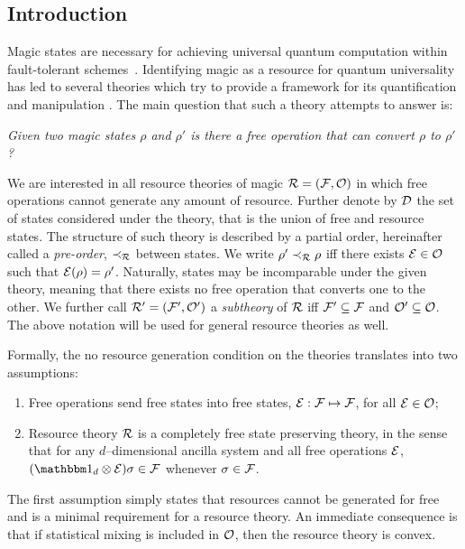 \documentclass[pra,
aps,
twocolumn,
superscriptaddress,
groupedaddress,
nofootinbib,
reprint
]{revtex4-1}
\begin{document}
\subsection{Introduction}
\label{sec:intro}

Magic states are necessary for achieving universal quantum computation within fault-tolerant schemes~\cite{cit:veitch, cit:mari, cit:gottesman, cit:bravyi, cit:knill, Campbell_2011}.
Identifying magic as a resource for quantum universality has led to several theories which try to provide a framework for its quantification and manipulation \cite{cit:veitch2, cit:howard, Wang_2019, Seddon_2021}.
The main question that such a theory attempts to answer is:
\begin{center}
    \emph{Given two magic states $\rho$ and $\rho'$ is there a free operation that can convert $\rho$ to $\rho'$?}
\end{center}

We are interested in all resource theories of magic $\mathcal{R} = (\mathcal{F}, \mathcal{O})$ in which free operations cannot generate any amount of resource. 
Further denote by $\mathcal{D}$ the set of states considered under the theory, that is the union of free and resource states.
The structure of such theory is described by a partial order, hereinafter called a \emph{pre-order}, $\prec_{\mathcal{R}}$ between states.
We write $\rho' \prec_{\mathcal{R}} \rho$ iff there exists $\mathcal{E} \in \mathcal{O}$ such that $\mathcal{E}(\rho) = \rho'$.
Naturally, states may be incomparable under the given theory, meaning that there exists no free operation that converts one to the other.
We further call $\mathcal{R}' = (\mathcal{F}', \mathcal{O}')$ a \emph{subtheory} of $\mathcal{R}$ iff $\mathcal{F}' \subseteq \mathcal{F}$ and $\mathcal{O}' \subseteq \mathcal{O}$. 
The above notation will be used for general resource theories as well.

Formally, the no resource generation condition on the theories translates into two assumptions:
\begin{enumerate}[I]
    \item Free operations send free states into free states, $\mathcal{E}: \mathcal{F} \mapsto \mathcal{F}$, for all $\mathcal{E} \in \mathcal{O}$;
    \item Resource theory $\mathcal{R}$ is a completely free state preserving theory, in the sense that for any $d$--dimensional ancilla system and all free operations $\mathcal{E}$, $(\id_d \otimes \E ) \sigma \in \F$ whenever $\sigma \in \mathcal{F}$.
\end{enumerate}
The first assumption simply states that resources cannot be generated for free and is a minimal requirement for a resource theory. 
An immediate consequence is that if statistical mixing is included in $\mathcal{O}$, then the resource theory is convex.
\end{document}
